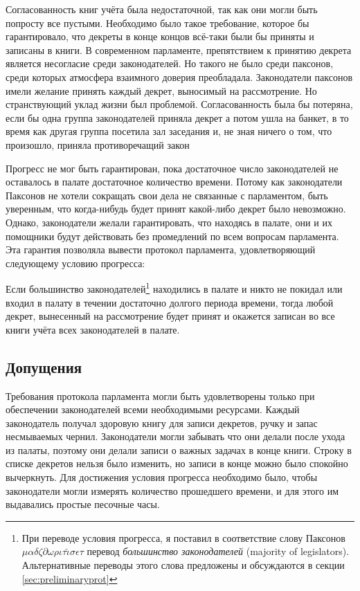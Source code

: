 \documentclass[12pt, a4paper]{article} %
\begin{document}
Согласованность книг учёта была недостаточной, так как они могли быть попросту все пустыми. Необходимо было такое требование, которое бы гарантировало, что декреты в конце концов всё-таки были бы приняты и записаны в книги. В современном парламенте, препятствием к принятию декрета является несогласие среди законодателей. Но такого не было среди паксонов, среди которых  атмосфера взаимного доверия преобладала. Законодатели паксонов имели желание принять каждый декрет, выносимый на рассмотрение. Но странствующий уклад жизни был проблемой. Согласованность была бы потеряна, если бы одна группа законодателей приняла декрет 
а потом ушла на банкет, в то время как другая группа посетила зал заседания и, не зная ничего о том, что произошло, приняла противоречащий закон 

Прогресс не мог быть гарантирован, пока достаточное число законодателей не оставалось в палате достаточное количество времени. Потому как законодатели Паксонов не хотели сокращать свои дела не связанные с парламентом, быть уверенным, что когда-нибудь будет принят какой-либо декрет было невозможно. Однако, законодатели желали гарантировать, что находясь в палате, они и их помощники будут действовать без промедлений по всем вопросам парламента. Эта гарантия позволяла вывести протокол парламента, удовлетворяющий следующему условию прогресса:

    Если большинство законодателей\footnote{При переводе условия прогресса, я поставил в соответствие слову Паксонов $\mu\alpha\delta\zeta\partial\omega\rho\iota\tau\check{\iota}\sigma\epsilon\tau$ перевод \textit{большинство законодателей} (majority of legislators). Альтернативные переводы этого слова предложены и обсуждаются в секции \ref{sec:preliminaryprot}} находились в палате и никто не покидал или входил в палату в течении достаточно долгого периода времени, тогда любой декрет, вынесенный на рассмотрение будет принят и окажется записан во все книги учёта всех законодателей в палате.

\subsection{Допущения}

Требования протокола парламента могли быть удовлетворены только при обеспечении законодателей всеми необходимыми ресурсами. Каждый законодатель получал здоровую книгу для записи декретов, ручку и запас несмываемых чернил. Законодатели могли забывать что они делали после ухода из палаты, поэтому они делали записи о важных задачах в конце книги. Строку в списке декретов нельзя было изменить, но записи в конце можно было спокойно вычеркнуть. Для достижения условия прогресса необходимо было, чтобы законодатели могли измерять количество прошедшего времени, и для этого им выдавались простые песочные часы.
\end{document}
